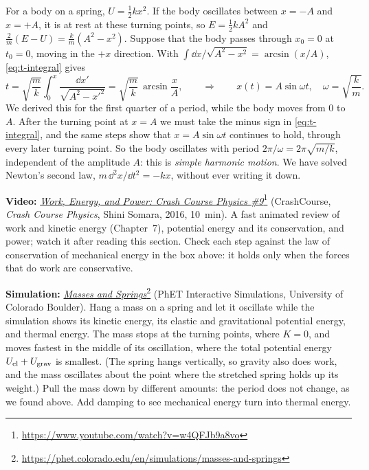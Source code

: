 \documentclass[11pt,a4paper]{article}
\begin{document}
\begin{example}
\setlength{\parskip}{0.5em plus 0.1em}%
For a body on a spring, $U = \frac12 kx^2$. If the body oscillates between $x = -A$ and $x = +A$,
it is at rest at these turning points, so $E = \frac12 kA^2$ and
$\frac{2}{m}(E - U) = \frac{k}{m}(A^2 - x^2)$. Suppose that the body passes through $x_0 = 0$ at
$t_0 = 0$, moving in the $+x$ direction. With $\int \dd x/\sqrt{A^2 - x^2} = \arcsin(x/A)$,
\eqref{eq:t-integral} gives
\[
  t = \sqrt{\frac{m}{k}}\int_0^x \frac{\dd x'}{\sqrt{A^2 - x'^2}} = \sqrt{\frac{m}{k}}\,\arcsin\frac{x}{A} ,
  \qquad\Rightarrow\qquad x(t) = A\sin\omega t , \quad \omega = \sqrt{\frac{k}{m}} .
\]
We derived this for the first quarter of a period, while the body moves from $0$ to $A$. After the
turning point at $x = A$ we must take the minus sign in \eqref{eq:t-integral}, and the same steps
show that $x = A\sin\omega t$ continues to hold, through every later turning point. So the body
oscillates with period $2\pi/\omega = 2\pi\sqrt{m/k}$, independent of the amplitude $A$:
this is \emph{simple harmonic motion}. We have solved Newton's second law,
${m\,\dd^2x/\dd t^2 = -kx}$, without ever writing it down.
\end{example}

\begin{aside}
\textbf{Video:}
\href{https://www.youtube.com/watch?v=w4QFJb9a8vo}{\emph{Work, Energy, and Power: Crash Course
Physics \#9}}\footnote{\url{https://www.youtube.com/watch?v=w4QFJb9a8vo}} (CrashCourse,
\emph{Crash Course Physics}, Shini Somara, 2016, 10~min). A fast animated review of work and
kinetic energy (Chapter~7), potential energy and its conservation, and power; watch it after
reading this section. Check each step against the law of conservation of mechanical energy in the
box above: it holds only when the forces that do work are conservative.
\par\smallskip
\textbf{Simulation:}
\href{https://phet.colorado.edu/en/simulations/masses-and-springs}{\emph{Masses and
Springs}}\footnote{\url{https://phet.colorado.edu/en/simulations/masses-and-springs}} (PhET
Interactive Simulations, University of Colorado Boulder). Hang a mass on a spring and let it
oscillate while the simulation shows its kinetic energy, its elastic and gravitational potential
energy, and thermal energy. The mass stops at the turning points, where $K = 0$, and moves fastest
in the middle of its oscillation, where the total potential energy $U_{\mathrm{el}} + U_{\mathrm{grav}}$ is
smallest. (The spring hangs vertically, so gravity also does work, and the mass oscillates about
the point where the stretched spring holds up its weight.) Pull the mass down by different amounts:
the period does not change, as we found above. Add damping to see mechanical energy turn into
thermal energy.
\end{aside}
\end{document}
